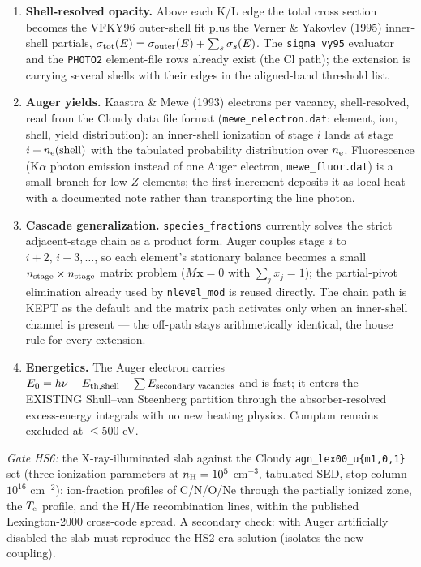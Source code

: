 \documentclass[english,a4paper]{my_memo}
\newcommand{\code}[1]{\texttt{#1}}
\newcommand{\Te}{T_{\rm e}}
\begin{document}
\begin{enumerate}[leftmargin=2em]
\item \textbf{Shell-resolved opacity.}  Above each K/L edge the total
  cross section becomes the VFKY96 outer-shell fit plus the Verner \&
  Yakovlev (1995) inner-shell partials,
  $\sigma_{\rm tot}(E)=\sigma_{\rm outer}(E)+\sum_s\sigma_s(E)$.  The
  \code{sigma\_vy95} evaluator and the \code{PHOTO2} element-file rows
  already exist (the Cl path); the extension is carrying several shells
  with their edges in the aligned-band threshold list.
\item \textbf{Auger yields.}  Kaastra \& Mewe (1993) electrons per
  vacancy, shell-resolved, read from the Cloudy data file format
  (\code{mewe\_nelectron.dat}: element, ion, shell, yield
  distribution): an inner-shell ionization of stage $i$ lands at stage
  $i+n_{\rm e}({\rm shell})$ with the tabulated probability
  distribution over $n_{\rm e}$.  Fluorescence (K$\alpha$ photon
  emission instead of one Auger electron, \code{mewe\_fluor.dat}) is
  a small branch for low-$Z$ elements; the first increment deposits it
  as local heat with a documented note rather than transporting the
  line photon.
\item \textbf{Cascade generalization.}  \code{species\_fractions}
  currently solves the strict adjacent-stage chain as a product form.
  Auger couples stage $i$ to $i+2,\,i+3,\dots$, so each element's
  stationary balance becomes a small $n_{\rm stage}\times n_{\rm stage}$
  matrix problem ($M\mathbf{x}=0$ with $\sum_j x_j=1$); the
  partial-pivot elimination already used by \code{nlevel\_mod} is
  reused directly.  The chain path is KEPT as the default and the
  matrix path activates only when an inner-shell channel is present ---
  the off-path stays arithmetically identical, the house rule for every
  extension.
\item \textbf{Energetics.}  The Auger electron carries
  $E_0 = h\nu - E_{\rm th,shell} - \sum E_{\text{secondary vacancies}}$
  and is fast; it enters the EXISTING Shull--van Steenberg partition
  through the absorber-resolved excess-energy integrals with no new
  heating physics.  Compton remains excluded at $\leq$500 eV.
\end{enumerate}

\emph{Gate HS6:} the X-ray-illuminated slab against the Cloudy
\code{agn\_lex00\_u\{m1,0,1\}} set (three ionization parameters at
$n_{\rm H}=10^5$ cm$^{-3}$, tabulated SED, stop column
$10^{16}$ cm$^{-2}$): ion-fraction profiles of C/N/O/Ne through the
partially ionized zone, the $\Te$ profile, and the H/He recombination
lines, within the published Lexington-2000 cross-code spread.  A
secondary check: with Auger artificially disabled the slab must
reproduce the HS2-era solution (isolates the new coupling).
\end{document}
